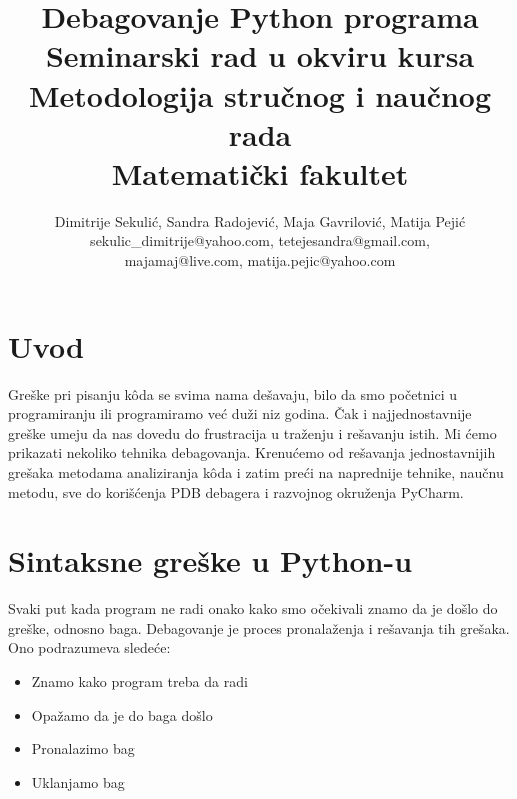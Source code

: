 \documentclass[a4paper]{article}
\begin{document}
\title{Debagovanje Python programa\\ \small{Seminarski rad u okviru kursa\\Metodologija stručnog i naučnog rada\\ Matematički fakultet}}

\author{Dimitrije Sekulić, Sandra Radojević, Maja Gavrilović, Matija Pejić\\ sekulic\_dimitrije@yahoo.com, tetejesandra@gmail.com,\\ majamaj@live.com, matija.pejic@yahoo.com}


\maketitle


\setcounter{tocdepth}{1}
\tableofcontents

\newpage

\section{Uvod}
\label{sec:uvod}

Greške pri pisanju k\^{o}da se svima nama dešavaju, bilo da smo početnici u programiranju ili programiramo već duži niz godina. Čak i najjednostavnije greške umeju da nas dovedu do frustracija u traženju i rešavanju istih. Mi ćemo prikazati nekoliko tehnika debagovanja. Krenućemo od rešavanja jednostavnijih grešaka metodama analiziranja k\^{o}da i zatim preći na naprednije tehnike, naučnu metodu, sve do korišćenja PDB debagera i razvojnog okruženja PyCharm.

\section{Sintaksne greške u Python-u}
Svaki put kada program ne radi onako kako smo očekivali znamo da je došlo do greške, odnosno baga. Debagovanje je proces pronalaženja i rešavanja tih grešaka. Ono podrazumeva sledeće:
\begin{itemize}
\item Znamo kako program treba da radi
\item Opažamo da je do baga došlo
\item Pronalazimo bag
\item Uklanjamo bag
\end{itemize}
\end{document}
